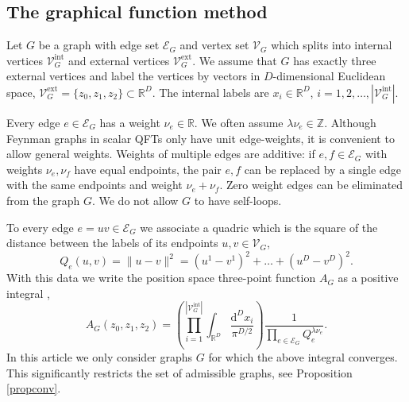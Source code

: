\documentclass[oneside]{amsart}
\newcommand{\RR}{{\mathbb R}}
\newcommand{\ZZ}{{\mathbb Z}}
\newcommand{\dd}{\mathrm{d}}
\newcommand{\sE}{\mathcal{E}}
\newcommand{\sV}{\mathcal{V}}
\newcommand{\sVGint}{{\sV_G^\mathrm{int}}}
\newcommand{\VGint}{{|\sVGint|}}
\newcommand{\sVGext}{{\sV_G^\mathrm{ext}}}
\theoremstyle{plain}
\begin{document}
\subsection{The graphical function method}

Let $G$ be a graph with edge set $\sE_G$ and vertex set $\sV_G$ which splits into internal vertices $\sVGint$ and external vertices $\sVGext$.
We assume that $G$ has exactly three external vertices and label the vertices by vectors in $D$-dimensional Euclidean space, $\sVGext=\{z_0,z_1,z_2\} \subset \RR^D$.
The internal labels are $x_i\in\RR^D$, $i=1,2,\ldots,\VGint$.

Every edge $e\in\sE_G$ has a weight $\nu_e\in\RR$. We often assume $\lambda\nu_e\in\ZZ$.
Although Feynman graphs in scalar QFTs only have unit edge-weights, it is convenient to allow general weights.
Weights of multiple edges are additive: if $e,f\in\sE_G$ with weights $\nu_e,\nu_f$ have equal endpoints, the pair $e,f$ can be replaced by a single edge with the same endpoints
and weight $\nu_e+\nu_f$. Zero weight edges can be eliminated from the graph $G$. We do not allow $G$ to have self-loops.

To every edge $e=uv\in\sE_G$ we associate a quadric which is the square of the distance between the labels of its endpoints $u,v\in\sV_G$,
\begin{equation}\label{eqQe}
Q_e(u,v)=\|u-v\|^2=(u^1-v^1)^2+\ldots+(u^D-v^D)^2.
\end{equation}
With this data we write the position space three-point function $A_G$ as a positive integral \cite{IZ},
\begin{equation}\label{eqAdef}
A_G(z_0,z_1,z_2)=\left(\prod_{i=1}^\VGint\int_{\RR^D}\frac{\dd^Dx_i}{\pi^{D/2}}\right)\frac{1}{\prod_{e\in\sE_G}Q_e^{\lambda\nu_e}}.
\end{equation}
In this article we only consider graphs $G$ for which the above integral converges. This significantly restricts the set of admissible graphs, see Proposition \ref{propconv}.
\end{document}
